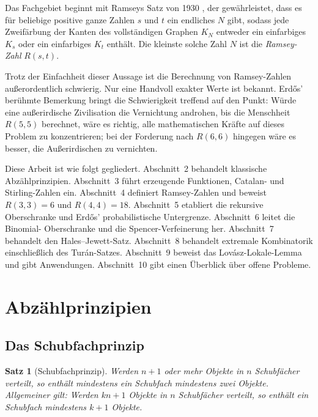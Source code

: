 \documentclass[12pt,a4paper]{amsart}
\newtheorem{theorem}{Satz}[section]
\theoremstyle{definition}
\theoremstyle{remark}
\begin{document}
Das Fachgebiet beginnt mit Ramseys Satz von 1930 \cite{Ramsey1930}, der
gew\"ahrleistet, dass es f\"ur beliebige positive ganze Zahlen $s$ und $t$ ein
endliches $N$ gibt, sodass jede Zweif\"arbung der Kanten des vollst\"andigen
Graphen $K_N$ entweder ein einfarbiges $K_s$ oder ein einfarbiges $K_t$ enth\"alt.
Die kleinste solche Zahl $N$ ist die \emph{Ramsey-Zahl} $R(s,t)$.

Trotz der Einfachheit dieser Aussage ist die Berechnung von Ramsey-Zahlen
au\ss{}erordentlich schwierig.  Nur eine Handvoll exakter Werte ist bekannt.
Erd\H{o}s' ber\"uhmte Bemerkung \cite{Erdos1947} bringt die Schwierigkeit
treffend auf den Punkt: W\"urde eine au\ss{}erirdische Zivilisation die Vernichtung
androhen, bis die Menschheit $R(5,5)$ berechnet, w\"are es richtig, alle
mathematischen Kr\"afte auf dieses Problem zu konzentrieren; bei der Forderung
nach $R(6,6)$ hingegen w\"are es besser, die Au\ss{}erirdischen zu vernichten.

Diese Arbeit ist wie folgt gegliedert.  Abschnitt~2 behandelt klassische
Abz\"ahlprinzipien.  Abschnitt~3 f\"uhrt erzeugende Funktionen, Catalan- und
Stirling-Zahlen ein.  Abschnitt~4 definiert Ramsey-Zahlen und beweist
$R(3,3)=6$ und $R(4,4)=18$.  Abschnitt~5 etabliert die rekursive Oberschranke
und Erd\H{o}s' probabilistische Untergrenze.  Abschnitt~6 leitet die Binomial-
Oberschranke und die Spencer-Verfeinerung her.  Abschnitt~7 behandelt den
Hales--Jewett-Satz.  Abschnitt~8 behandelt extremale Kombinatorik einschlie\ss{}lich
des Tur\'an-Satzes.  Abschnitt~9 beweist das Lov\'asz-Lokale-Lemma und gibt
Anwendungen.  Abschnitt~10 gibt einen \"Uberblick \"uber offene Probleme.

\section{Abz\"ahlprinzipien}

\subsection{Das Schubfachprinzip}

\begin{theorem}[Schubfachprinzip]\label{satz:schubfach}
Werden $n+1$ oder mehr Objekte in $n$ Schubf\"acher verteilt, so enth\"alt
mindestens ein Schubfach mindestens zwei Objekte.  Allgemeiner gilt: Werden
$kn+1$ Objekte in $n$ Schubf\"acher verteilt, so enth\"alt ein Schubfach
mindestens $k+1$ Objekte.
\end{theorem}
\end{document}
